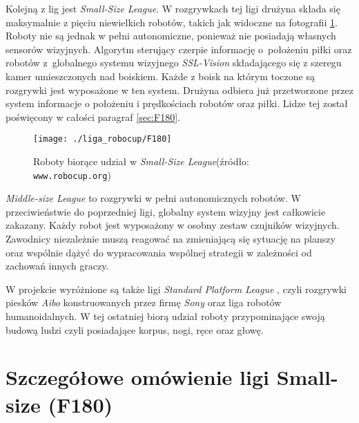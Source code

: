 	Kolejną z lig jest \emph{Small-Size League}. W rozgrywkach tej ligi drużyna składa się maksymalnie z pięciu niewielkich robotów, takich jak widoczne na fotografii \ref{fig:F180}. 
	Roboty  nie są jednak w pełni autonomiczne, ponieważ nie posiadają własnych sensorów wizyjnych. Algorytm sterujący czerpie informację o~położeniu piłki oraz robotów z~globalnego systemu
	wizyjnego \textit{SSL-Vision} składającego się z szeregu kamer umieszczonych nad boiskiem. Każde z boisk na którym toczone są rozgrywki jest wyposażone w ten system. Drużyna odbiera już przetworzone
	przez system informacje o położeniu i prędkościach robotów oraz piłki.
	Lidze tej został poświęcony w całości paragraf \ref{sec:F180}.	
	\begin{figure}[ht]
	\centering
	\texttt{[image: ./liga\_robocup/F180]}
	\caption{ Roboty biorące udział w \emph{Small-Size League}\newline(źródło: \texttt{www.robocup.org})} \label{fig:F180}
	\end{figure}
	
	\emph{Middle-size League} to rozgrywki w pełni autonomicznych robotów. W przeciwieństwie do poprzedniej ligi, globalny system wizyjny jest całkowicie zakazany.
	Każdy robot jest wyposażony w osobny zestaw czujników wizyjnych. Zawodnicy niezależnie muszą reagować na zmieniającą się sytuację na planszy oraz
	wspólnie dążyć do wypracowania wspólnej strategii w zależności od zachowań innych graczy.

	W projekcie wyróżnione są także ligi \emph{Standard Platform League }, czyli rozgrywki piesków \textit{Aibo} konstruowanych przez firmę \textit{Sony} oraz 
	liga robotów humanoidalnych. W tej ostatniej biorą udział roboty przypominające swoją budową ludzi czyli posiadające korpus, nogi, ręce oraz głowę.
	\section{Szczegółowe omówienie ligi Small-size (F180) \label{sec:F180}}
